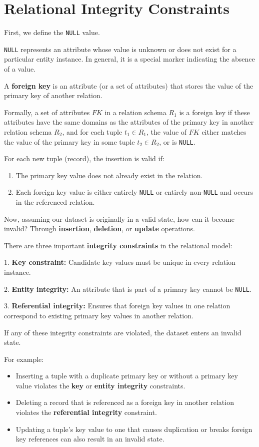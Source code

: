 \section{Relational Integrity Constraints}

First, we define the \texttt{NULL} value.  

\texttt{NULL} represents an attribute whose value is unknown or does not exist for a particular entity instance. In general, it is a special marker indicating the absence of a value.  

A \textbf{foreign key} is an attribute (or a set of attributes) that stores the value of the primary key of another relation.  

Formally, a set of attributes \(FK\) in a relation schema \(R_1\) is a foreign key if these attributes have the same domains as the attributes of the primary key in another relation schema \(R_2\), and for each tuple \(t_1 \in R_1\), the value of \(FK\) either matches the value of the primary key in some tuple \(t_2 \in R_2\), or is \texttt{NULL}.  

For each new tuple (record), the insertion is valid if:
\begin{enumerate}
  \item The primary key value does not already exist in the relation.  
  \item Each foreign key value is either entirely \texttt{NULL} or entirely non-\texttt{NULL} and occurs in the referenced relation.  
\end{enumerate}

Now, assuming our dataset is originally in a valid state, how can it become invalid? Through \textbf{insertion}, \textbf{deletion}, or \textbf{update} operations.  

There are three important \textbf{integrity constraints} in the relational model:

1. \textbf{Key constraint:} Candidate key values must be unique in every relation instance.  

2. \textbf{Entity integrity:} An attribute that is part of a primary key cannot be \texttt{NULL}.  

3. \textbf{Referential integrity:} Ensures that foreign key values in one relation correspond to existing primary key values in another relation.  

If any of these integrity constraints are violated, the dataset enters an invalid state.  

For example:
\begin{itemize}
  \item Inserting a tuple with a duplicate primary key or without a primary key value violates the \textbf{key} or \textbf{entity integrity} constraints.  
  \item Deleting a record that is referenced as a foreign key in another relation violates the \textbf{referential integrity} constraint.  
  \item Updating a tuple’s key value to one that causes duplication or breaks foreign key references can also result in an invalid state.  
\end{itemize}
